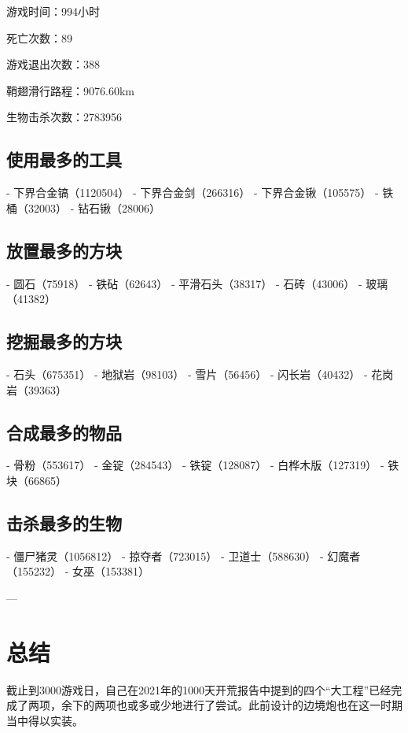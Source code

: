 \documentclass[openany]{book}
\theoremstyle{remark}\newtheorem*{remark}{Remark}
\begin{document}
	游戏时间：994小时
	
	死亡次数：89
	
	游戏退出次数：388
	
	鞘翅滑行路程：9076.60km
	
	生物击杀次数：2783956
	
	\subsection{使用最多的工具}
	
	- 下界合金镐（1120504）
	- 下界合金剑（266316）
	- 下界合金锹（105575）
	- 铁桶（32003）
	- 钻石锹（28006）
	
	\subsection{放置最多的方块}
	
	- 圆石（75918）
	- 铁砧（62643）
	- 平滑石头（38317）
	- 石砖（43006）
	- 玻璃（41382）
	
	\subsection{挖掘最多的方块}
	
	- 石头（675351）
	- 地狱岩（98103）
	- 雪片（56456）
	- 闪长岩（40432）
	- 花岗岩（39363）
	
	\subsection{合成最多的物品}
	
	- 骨粉（553617）
	- 金锭（284543）
	- 铁锭（128087）
	- 白桦木版（127319）
	- 铁块（66865）
	
	\subsection{击杀最多的生物}
	
	- 僵尸猪灵（1056812）
	- 掠夺者（723015）
	- 卫道士（588630）
	- 幻魔者（155232）
	- 女巫（153381）
	
	---
	
	\section{总结}
	
	截止到3000游戏日，自己在2021年的1000天开荒报告中提到的四个“大工程”已经完成了两项，余下的两项也或多或少地进行了尝试。此前设计的边境炮也在这一时期当中得以实装。
	
\end{document}
